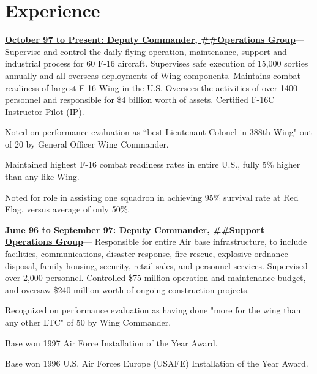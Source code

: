 \documentclass[10pt,letterpaper]{scrartcl}
\newenvironment{accomplishments}{%
	\begin{list}{\textbullet}{%
        \setlength\leftmargin{1em}      %
        \setlength\topsep{0ex}          %
        \setlength\parskip{0.5ex}
        \setstretch{0.8}
        \setlength\listparindent{1em}   %
        \setlength\parsep{0in}          %
        \setlength\itemsep{0.5ex}         %
        }
}{
	\end{list}
}
\newcommand{\accomplishment}{\item }
\newenvironment{job}[4]{%
\vspace{0.0em}
\noindent\textbf{\underline{{#1: #2\ifthenelse{\isempty{#3}}{}{, #3}}}}---#4%
\noindent\begin{accomplishments}{}
}{
\end{accomplishments}
\vspace{1.5em}
}
\begin{document}
\maketitle

\section*{Experience}

\begin{job}{October 97 to Present}{Deputy Commander, \#\#Operations Group}{USAFB}{%
Supervise and control the daily flying operation,
maintenance, support and industrial process for 60 F-16 aircraft. Supervises safe execution of 15,000 sorties annually and all overseas
deployments of Wing components. Maintains combat readiness of largest F-16 Wing in the U.S. Oversees the activities of over 1400
personnel and responsible for \$4 billion worth of assets. Certified F-16C Instructor Pilot (IP).
}
\accomplishment Noted on performance evaluation as ``best Lieutenant Colonel in 388th Wing" out of 20 by General Officer Wing Commander.
\accomplishment Maintained highest F-16 combat readiness rates in entire U.S., fully 5\% higher than any like Wing.
\accomplishment Noted for role in assisting one squadron in achieving 95\% survival rate at Red Flag, versus average of only 50\%.
\end{job}

\begin{job}{June 96 to September 97}{Deputy Commander, \#\#Support Operations Group}{USAB}{%
Responsible for entire Air base infrastructure, to include facilities, communications, disaster response, fire rescue, explosive ordnance disposal, family housing,
security, retail sales, and personnel services. Supervised over 2,000 personnel. Controlled \$75 million operation and maintenance
budget, and oversaw \$240 million worth of ongoing construction projects.
}
\accomplishment Recognized on performance evaluation as having done "more for the wing than any other LTC" of 50 by Wing Commander.
\accomplishment Base won 1997 Air Force Installation of the Year Award.
\accomplishment Base won 1996 U.S. Air Forces Europe (USAFE) Installation of the Year Award.
\end{job}
\end{document}
